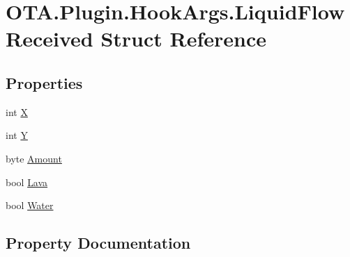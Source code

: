 \hypertarget{struct_o_t_a_1_1_plugin_1_1_hook_args_1_1_liquid_flow_received}{}\section{O\+T\+A.\+Plugin.\+Hook\+Args.\+Liquid\+Flow\+Received Struct Reference}
\label{struct_o_t_a_1_1_plugin_1_1_hook_args_1_1_liquid_flow_received}
\subsection*{Properties}
\begin{DoxyCompactItemize}
\item 
int \hyperlink{struct_o_t_a_1_1_plugin_1_1_hook_args_1_1_liquid_flow_received_aecd7b461faba26aea1b3ae2b38831036}{X}
\item 
int \hyperlink{struct_o_t_a_1_1_plugin_1_1_hook_args_1_1_liquid_flow_received_a8ec627eed0854f721600fdfeb07ba8cd}{Y}
\item 
byte \hyperlink{struct_o_t_a_1_1_plugin_1_1_hook_args_1_1_liquid_flow_received_a935c9968872367da643682dff4cb0211}{Amount}
\item 
bool \hyperlink{struct_o_t_a_1_1_plugin_1_1_hook_args_1_1_liquid_flow_received_a393a07607d06f518bba9a7db25eeb3b0}{Lava}
\item 
bool \hyperlink{struct_o_t_a_1_1_plugin_1_1_hook_args_1_1_liquid_flow_received_a45f7a6b6e1b06dd9f3bf99918a7d10d0}{Water}
\end{DoxyCompactItemize}


\subsection{Property Documentation}
\hypertarget{struct_o_t_a_1_1_plugin_1_1_hook_args_1_1_liquid_flow_received_a935c9968872367da643682dff4cb0211}{}
